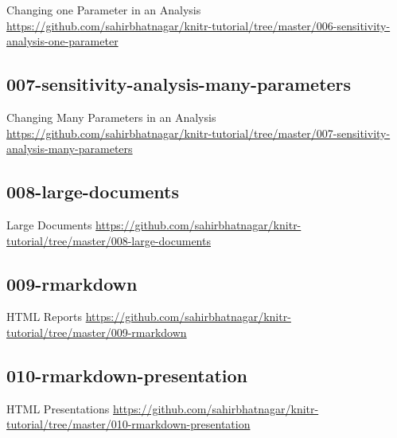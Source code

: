 \documentclass[10pt]{beamer}\usepackage[]{graphicx}\usepackage[]{color}
\begin{document}
\begin{frame}{Changing one Parameter in an Analysis}
\href{https://github.com/sahirbhatnagar/knitr-tutorial/tree/master/006-sensitivity-analysis-one-parameter}{https://github.com/sahirbhatnagar/knitr-tutorial/tree/master/006-sensitivity-analysis-one-parameter}
\end{frame}

\subsection{007-sensitivity-analysis-many-parameters}

\begin{frame}{Changing Many Parameters in an Analysis}
\href{https://github.com/sahirbhatnagar/knitr-tutorial/tree/master/007-sensitivity-analysis-many-parameters}{https://github.com/sahirbhatnagar/knitr-tutorial/tree/master/007-sensitivity-analysis-many-parameters}
\end{frame}


\subsection{008-large-documents}

\begin{frame}{Large Documents}
\href{https://github.com/sahirbhatnagar/knitr-tutorial/tree/master/008-large-documents}{https://github.com/sahirbhatnagar/knitr-tutorial/tree/master/008-large-documents}
\end{frame}

\subsection{009-rmarkdown}

\begin{frame}{HTML Reports}
\href{https://github.com/sahirbhatnagar/knitr-tutorial/tree/master/009-rmarkdown}{https://github.com/sahirbhatnagar/knitr-tutorial/tree/master/009-rmarkdown}
\end{frame}

\subsection{010-rmarkdown-presentation}

\begin{frame}{HTML Presentations}
\href{https://github.com/sahirbhatnagar/knitr-tutorial/tree/master/010-rmarkdown-presentation}{https://github.com/sahirbhatnagar/knitr-tutorial/tree/master/010-rmarkdown-presentation}
\end{frame}
\end{document}
